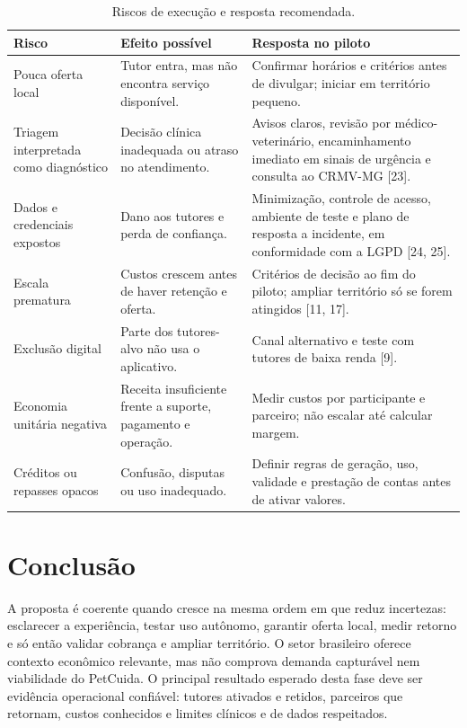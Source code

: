 \documentclass[12pt,a4paper]{article}
\begin{document}
\begin{table}[H]
\centering
\small
\caption{Riscos de execução e resposta recomendada.}
\begin{tabularx}{\textwidth}{P{3.2cm}YY}
\toprule
\textbf{Risco} & \textbf{Efeito possível} & \textbf{Resposta no piloto} \\
\midrule
Pouca oferta local & Tutor entra, mas não encontra serviço disponível. & Confirmar horários e critérios antes de divulgar; iniciar em território pequeno. \\
Triagem interpretada como diagnóstico & Decisão clínica inadequada ou atraso no atendimento. & Avisos claros, revisão por médico-veterinário, encaminhamento imediato em sinais de urgência e consulta ao CRMV-MG [23]. \\
Dados e credenciais expostos & Dano aos tutores e perda de confiança. & Minimização, controle de acesso, ambiente de teste e plano de resposta a incidente, em conformidade com a LGPD [24, 25]. \\
Escala prematura & Custos crescem antes de haver retenção e oferta. & Critérios de decisão ao fim do piloto; ampliar território só se forem atingidos [11, 17]. \\
Exclusão digital & Parte dos tutores-alvo não usa o aplicativo. & Canal alternativo e teste com tutores de baixa renda [9]. \\
Economia unitária negativa & Receita insuficiente frente a suporte, pagamento e operação. & Medir custos por participante e parceiro; não escalar até calcular margem. \\
Créditos ou repasses opacos & Confusão, disputas ou uso inadequado. & Definir regras de geração, uso, validade e prestação de contas antes de ativar valores. \\
\bottomrule
\end{tabularx}
\end{table}

\section{Conclusão}

A proposta é coerente quando cresce na mesma ordem em que reduz incertezas: esclarecer a experiência, testar uso autônomo, garantir oferta local, medir retorno e só então validar cobrança e ampliar território. O setor brasileiro oferece contexto econômico relevante, mas não comprova demanda capturável nem viabilidade do PetCuida. O principal resultado esperado desta fase deve ser evidência operacional confiável: tutores ativados e retidos, parceiros que retornam, custos conhecidos e limites clínicos e de dados respeitados.
\end{document}
